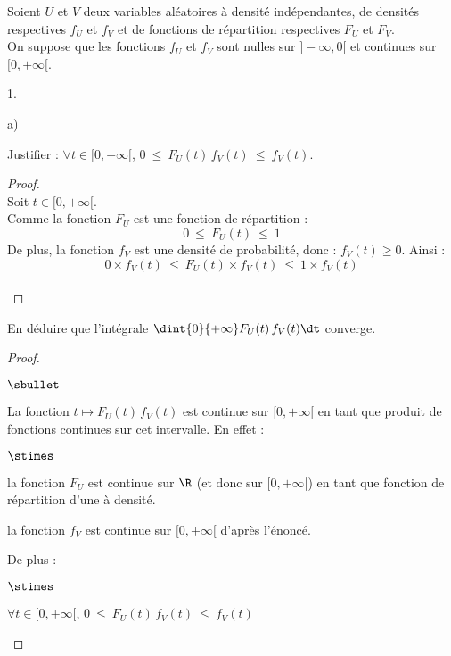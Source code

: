 \documentclass[11pt]{article}%
\begin{document}
\noindent %
Soient $U$ et $V$ deux variables aléatoires à densité indépendantes,
de densités respectives $f_U$ et $f_V$ et de fonctions de répartition
respectives $F_U$ et $F_V$.\\
On suppose que les fonctions $f_U$ et $f_V$ sont nulles sur $]-\infty,
0[$ et continues sur $[0,+\infty[$.
\begin{noliste}{1.}
  \setlength{\itemsep}{4mm}
\item
  \begin{noliste}{a)}
    \setlength{\itemsep}{2mm}
  \item Justifier : $\forall t \in [0,+\infty[$, $0 \ \leq \ F_U(t) \,
    f_V(t) \ \leq \ f_V(t)$.
    \begin{proof}~\\
      Soit $t \in [0,+\infty[$.\\
      Comme la fonction $F_U$ est une fonction de répartition :
      \[
        0 \ \leq \ F_U(t) \ \leq \ 1
      \]
      De plus, la fonction $f_V$ est une densité de probabilité, donc
      : $f_V(t) \geq 0$. Ainsi :
      \[
        0 \times f_V(t) \ \leq \ F_U(t) \times f_V(t)
        \ \leq \ 1 \times f_V(t)
      \]
      \conc{On obtient : $\forall t \in [0,+\infty[$, $0 \ \leq \ F_U(t)
        \, f_V(t) \ \leq \ f_V(t)$.}~\\[-1cm]
    \end{proof}
    
  \item En déduire que l'intégrale $\dint{0}{+\infty} F_U(t) \, f_V(t)
    \dt$ converge.
    \begin{proof}~
      \begin{noliste}{$\sbullet$}
      \item La fonction $t \mapsto F_U(t) \, f_V(t)$ est continue sur
        $[0,+ \infty[$ en tant que produit de fonctions continues sur
        cet intervalle. En effet :
        \begin{noliste}{$\stimes$}
        \item la fonction $F_U$ est continue sur $\R$ (et donc sur
          $[0,+\infty[$) en tant que fonction de répartition d'une \var
          à densité.
          
        \item la fonction $f_V$ est continue sur $[0,+\infty[$ d'après
          l'énoncé.
        \end{noliste}
        
      \item De plus :
        \begin{noliste}{$\stimes$}
        \item $\forall t \in [0,+\infty[$, $0 \ \leq \ F_U(t) \,
          f_V(t) \ \leq \ f_V(t)$
          

\end{noliste}
\end{noliste}
\end{proof}
\end{noliste}
\end{noliste}
\end{document}

